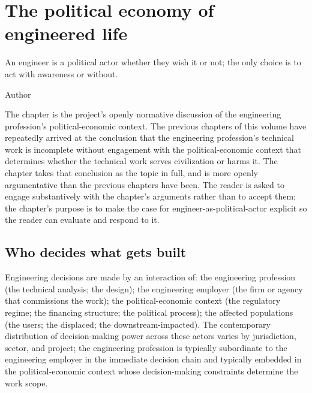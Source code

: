 \chapter{The political economy of engineered life}
\label{vol12:ch13}

\epigraph{An engineer is a political actor whether they wish it or not; the only choice is to act with awareness or without.}{Author}


\noindent
The chapter is the project's openly normative discussion of the engineering profession's political-economic context. The previous chapters of this volume have repeatedly arrived at the conclusion that the engineering profession's technical work is incomplete without engagement with the political-economic context that determines whether the technical work serves civilization or harms it. The chapter takes that conclusion as the topic in full, and is more openly argumentative than the previous chapters have been. The reader is asked to engage substantively with the chapter's arguments rather than to accept them; the chapter's purpose is to make the case for engineer-as-political-actor explicit so the reader can evaluate and respond to it.

\section{Who decides what gets built}

Engineering decisions are made by an interaction of: the engineering profession (the technical analysis; the design); the engineering employer (the firm or agency that commissions the work); the political-economic context (the regulatory regime; the financing structure; the political process); the affected populations (the users; the displaced; the downstream-impacted). The contemporary distribution of decision-making power across these actors varies by jurisdiction, sector, and project; the engineering profession is typically subordinate to the engineering employer in the immediate decision chain and typically embedded in the political-economic context whose decision-making constraints determine the work scope.

